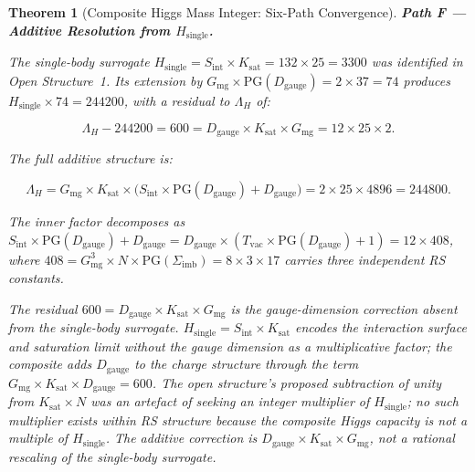 \documentclass[11pt, letterpaper]{article}
\newcommand{\Sinter}{S_{\mathrm{int}}}
\theoremstyle{definition}
\theoremstyle{plain}
\newtheorem{theorem}{Theorem}[section]
\begin{document}
\begin{theorem}[Composite Higgs Mass Integer: Six-Path Convergence]
\medskip
\noindent\textbf{Path F — Additive Resolution from $H_\mathrm{single}$.}

The single-body surrogate $H_\mathrm{single} = \Sinter \times K_\mathrm{sat} = 132 \times 25 = 3300$
was identified in Open Structure~1. Its extension by $G_\mathrm{mg} \times \mathrm{PG}(D_\mathrm{gauge})
= 2 \times 37 = 74$ produces $H_\mathrm{single} \times 74 = 244200$, with a residual to $\Lambda_H$
of:

\begin{equation}
    \Lambda_H - 244200 = 600 = D_\mathrm{gauge} \times K_\mathrm{sat} \times G_\mathrm{mg}
                               = 12 \times 25 \times 2.
\end{equation}

The full additive structure is:

\begin{equation}
    \Lambda_H = G_\mathrm{mg} \times K_\mathrm{sat} \times
                \bigl(\Sinter \times \mathrm{PG}(D_\mathrm{gauge}) + D_\mathrm{gauge}\bigr)
              = 2 \times 25 \times 4896 = 244800.
\end{equation}

The inner factor decomposes as
$\Sinter \times \mathrm{PG}(D_\mathrm{gauge}) + D_\mathrm{gauge}
= D_\mathrm{gauge} \times (T_\mathrm{vac} \times \mathrm{PG}(D_\mathrm{gauge}) + 1)
= 12 \times 408$, where $408 = G_\mathrm{mg}^3 \times N \times \mathrm{PG}(\Sigma_\mathrm{imb})
= 8 \times 3 \times 17$ carries three independent RS constants.

\medskip
The residual $600 = D_\mathrm{gauge} \times K_\mathrm{sat} \times G_\mathrm{mg}$ is the
gauge-dimension correction absent from the single-body surrogate. $H_\mathrm{single} = \Sinter \times K_\mathrm{sat}$
encodes the interaction surface and saturation limit without the gauge dimension as a
multiplicative factor; the composite adds $D_\mathrm{gauge}$ to the charge structure
through the term $G_\mathrm{mg} \times K_\mathrm{sat} \times D_\mathrm{gauge} = 600$.
The open structure's proposed subtraction of unity from $K_\mathrm{sat} \times N$ was an
artefact of seeking an integer multiplier of $H_\mathrm{single}$; no such multiplier
exists within RS structure because the composite Higgs capacity is not a multiple of
$H_\mathrm{single}$. The additive correction is $D_\mathrm{gauge} \times K_\mathrm{sat} \times G_\mathrm{mg}$,
not a rational rescaling of the single-body surrogate.
\end{theorem}
\end{document}
